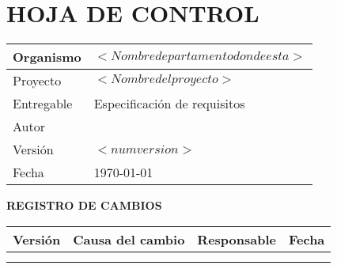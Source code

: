 \section*{HOJA DE CONTROL}
\thispagestyle{empty}

     \vspace{1cm}

\begin{table}[!htb]
    \centering
    \begin{tabular}{|p{3cm}|p{8cm}|}
        \hline
         \cellcolor{gray30}  Organismo	&$< Nombre departamento donde esta>$\\ 
        \hline
         \cellcolor{gray30}  Proyecto	&  $<Nombre del proyecto>$\\   
         \hline
         \cellcolor{gray30}  Entregable & Especificación de requisitos\\  
        \hline
         \cellcolor{gray30}  Autor	& \equipo  \\
        \hline
         \cellcolor{gray30}  Versión	& $<num version>$\\   
        \hline
         \cellcolor{gray30}  Fecha	& \today \\  
        \hline
    \end{tabular}
  \end{table}



\textbf{ REGISTRO DE CAMBIOS}

\begin{table}[!htb]
    \centering
    \begin{tabular}{|p{7ex}|p{20ex}|p{25ex}|p{8ex}|}
        \hline
         \rowcolor{gray30}  Versión	& Causa del cambio& Responsable & Fecha\\ 
        \hline
         &      &    	&  \\   
        \hline
          &     &    	&  \\     
        \hline
    \end{tabular}
\end{table}


